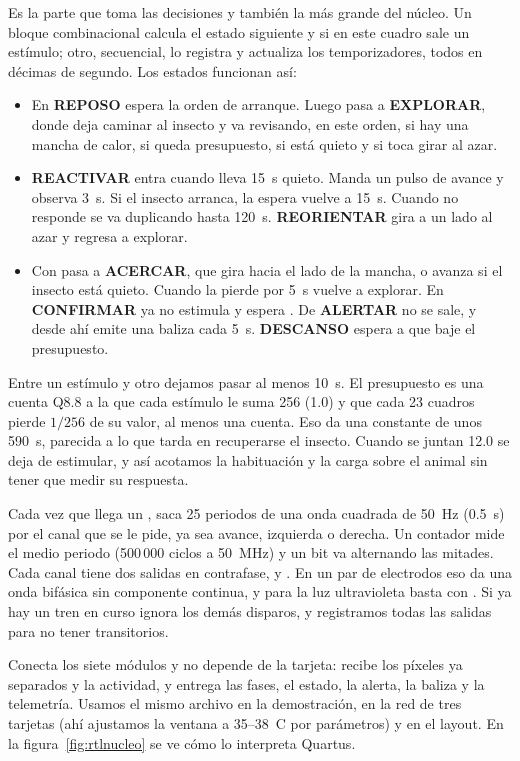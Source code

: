 Es la parte que toma las decisiones y también la más grande del núcleo. Un bloque combinacional calcula el estado siguiente y si
en este cuadro sale un estímulo; otro, secuencial, lo registra y actualiza los temporizadores, todos en décimas de segundo. Los
estados funcionan así:
\begin{itemize}
    \item En \textbf{REPOSO} espera la orden de arranque. Luego pasa a \textbf{EXPLORAR}, donde deja caminar al insecto y va
        revisando, en este orden, si hay una mancha de calor, si queda presupuesto, si está quieto y si toca girar al azar.
  \item \textbf{REACTIVAR} entra cuando lleva 15~s quieto. Manda un pulso de avance y observa 3~s. Si el insecto arranca, la espera vuelve a 15~s. Cuando no responde se va duplicando hasta 120~s. \textbf{REORIENTAR} gira a un lado al azar y regresa a explorar.
  \item Con  pasa a \textbf{ACERCAR}, que gira hacia el lado de la mancha, o avanza si el insecto está quieto. Cuando la pierde por 5~s vuelve a explorar. En \textbf{CONFIRMAR} ya no estimula y espera . De \textbf{ALERTAR} no se sale, y
        desde ahí emite una baliza cada 5~s. \textbf{DESCANSO} espera a que baje el presupuesto.
\end{itemize}
Entre un estímulo y otro dejamos pasar al menos 10~s. El presupuesto es una cuenta Q8.8 a la que cada estímulo le suma 256
(1.0) y que cada 23 cuadros pierde $1/256$ de su valor, al menos una cuenta. Eso da una constante de unos 590~s, parecida a lo
que tarda en recuperarse el insecto. Cuando se juntan 12.0 se deja de estimular, y así acotamos la habituación y la carga sobre
el animal sin tener que medir su respuesta.

Cada vez que llega un , saca 25 periodos de una onda cuadrada de 50~Hz (0.5~s) por el canal que se le pide, ya sea
avance, izquierda o derecha. Un contador mide el medio periodo (500\,000 ciclos a 50~MHz) y un bit va alternando las mitades.
Cada canal tiene dos salidas en contrafase,  y . En un par de electrodos eso da una onda bifásica sin
componente continua, y para la luz ultravioleta basta con . Si ya hay un tren en curso ignora los demás disparos, y
registramos todas las salidas para no tener transitorios.

Conecta los siete módulos y no depende de la tarjeta: recibe los píxeles ya separados y la actividad, y entrega las fases,
el estado, la alerta, la baliza y la telemetría. Usamos el mismo archivo en la demostración, en la red de tres tarjetas
(ahí ajustamos la ventana a 35--38~\textdegree C por parámetros) y en el layout. En la figura~\ref{fig:rtlnucleo} se ve
cómo lo interpreta Quartus.

